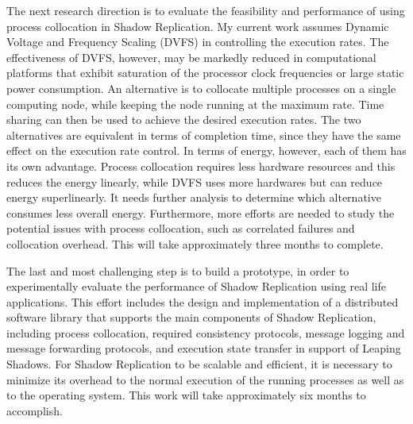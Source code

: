 The next research direction is to evaluate the feasibility and performance of using process collocation in Shadow Replication. My current work assumes Dynamic Voltage and Frequency Scaling (DVFS) in controlling the execution rates. The effectiveness of DVFS, however, may be markedly reduced in computational platforms that exhibit saturation of the processor clock frequencies or large static power consumption. An alternative is to collocate multiple processes on a single computing node, while keeping the node running at the maximum rate. Time sharing can then be used to achieve the desired execution rates.
%
The two alternatives are equivalent in terms of completion time, since they have the same effect on the execution rate control. In terms of energy, however, each of them has its own advantage. Process collocation requires less hardware resources and this reduces the energy linearly, while DVFS uses more hardwares but can reduce energy superlinearly. It needs further analysis to determine which alternative consumes less overall energy. Furthermore, more efforts are needed to study the potential issues with process collocation, such as correlated failures and collocation overhead. This will take approximately three months to complete. 

The last and most challenging step is to build a prototype, in order to experimentally evaluate the performance of Shadow Replication using real life applications. This effort includes the design and implementation of a distributed software library that supports the main components of Shadow Replication, including process collocation, required consistency protocols, message logging and message forwarding protocols, and execution state transfer in support of Leaping Shadows. For Shadow Replication to be scalable and efficient, it is necessary to minimize its overhead to the normal execution of the running processes as well as to the operating system. This work will take approximately six months to accomplish. 




